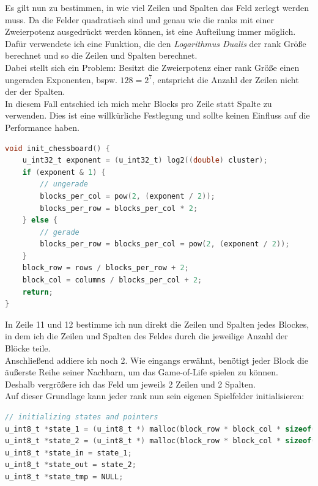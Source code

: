 \documentclass[german,plainarticle,hyperref,utf8]{zihpub}
\begin{document}
	Es gilt nun zu bestimmen, in wie viel Zeilen und Spalten das Feld zerlegt werden muss. Da die Felder quadratisch sind und genau wie die ranks mit einer Zweierpotenz ausgedrückt werden können, ist eine Aufteilung immer möglich.\\
	Dafür verwendete ich eine Funktion, die den \textit{Logarithmus Dualis} der rank Größe berechnet und so die Zeilen und Spalten berechnet.\\
	Dabei stellt sich ein Problem: Besitzt die Zweierpotenz einer rank Größe einen ungeraden Exponenten, bspw. $128 = 2^7$, entspricht die Anzahl der Zeilen nicht der der Spalten.\\
	In diesem Fall entschied ich mich mehr Blocks pro Zeile statt Spalte zu verwenden. Dies ist eine willkürliche Festlegung und sollte keinen Einfluss auf die Performance haben.\\
	\begin{lstlisting}[language=C, caption=Bestimmung der Zeilen und Spalten des chessboard Layouts]
void init_chessboard() {
	u_int32_t exponent = (u_int32_t) log2((double) cluster);
	if (exponent & 1) {
		// ungerade
		blocks_per_col = pow(2, (exponent / 2));
		blocks_per_row = blocks_per_col * 2;
	} else {
		// gerade
		blocks_per_row = blocks_per_col = pow(2, (exponent / 2));
	}
	block_row = rows / blocks_per_row + 2;
	block_col = columns / blocks_per_col + 2;
	return;
}\end{lstlisting}

	In Zeile 11 und 12 bestimme ich nun direkt die Zeilen und Spalten jedes Blockes, in dem ich die Zeilen und Spalten des Feldes durch die jeweilige Anzahl der Blöcke teile.\\
	Anschließend addiere ich noch 2. Wie eingangs erwähnt, benötigt jeder Block die äußerste Reihe seiner Nachbarn, um das Game-of-Life spielen zu können.\\
	Deshalb vergrößere ich das Feld um jeweils 2 Zeilen und 2 Spalten.\\
	
	Auf dieser Grundlage kann jeder rank nun sein eigenen Spielfelder initialisieren:
	\begin{lstlisting}[language=C, caption=Initialisierung der Spielfelder]
// initializing states and pointers
u_int8_t *state_1 = (u_int8_t *) malloc(block_row * block_col * sizeof(u_int8_t));
u_int8_t *state_2 = (u_int8_t *) malloc(block_row * block_col * sizeof(u_int8_t));
u_int8_t *state_in = state_1;
u_int8_t *state_out = state_2;
u_int8_t *state_tmp = NULL;
	\end{lstlisting}
	
\end{document}
